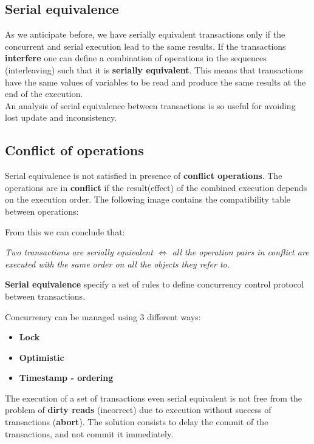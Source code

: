 \subsection{Serial equivalence}
As we anticipate before, we have serially equivalent transactions only if the concurrent and serial execution lead to the same results.
If the transactions \textbf{interfere} one can define a combination of operations in the sequences (interleaving) such that it is \textbf{serially equivalent}. This means that transactions have the same values of variables to be read and produce the same results at the end of the execution.\\
An analysis of serial equivalence between transactions is so useful for avoiding lost update and inconsistency.

\subsection{Conflict of operations}
Serial equivalence is not satisfied in presence of \textbf{conflict operations}. The operations are in \textbf{conflict} if the result(effect) of the combined execution depends on the execution order.
The following image contains the compatibility table between operations:


From this we can conclude that:
\begin{center}
\textit{Two transactions are serially equivalent $\iff$ all the operation pairs in conflict are executed with the same order on all the objects they refer to.}
\end{center}

\textbf{Serial equivalence} specify a set of rules to define concurrency control protocol between transactions.

Concurrency can be managed using 3 different ways:
\begin{itemize}
	\item \textbf{Lock}
	\item \textbf{Optimistic}
	\item \textbf{Timestamp - ordering}
\end{itemize}


The execution of a set of transactions even serial equivalent is not free from the problem of \textbf{dirty reads} (incorrect) due to execution without success of transactions (\textbf{abort}). The solution consists to delay the commit of the transactions, and not commit it immediately.

